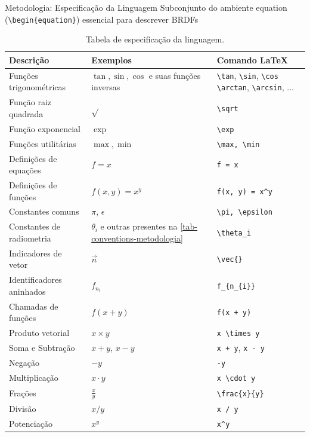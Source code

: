 \begin{frame}[fragile]{Metodologia: Especificação da Linguagem}
    Subconjunto do ambiente equation (\verb|\begin{equation}|) essencial para descrever BRDFs
\begin{table}
\centering
    \scriptsize %
\begin{tabular}{l|l|l}
\hline
    \textbf{Descrição} & \textbf{Exemplos} & \textbf{Comando \LaTeX{}} \\ \hline

    Funções trigonométricas & $\tan, \sin, \cos$ {\tiny e suas funções inversas}
    &\small\verb"\tan", \verb"\sin", \verb"\cos"
    \newline\verb"\arctan", \verb"\arcsin", $\dots$
    \\ \hline
    Função raiz quadrada & $\sqrt{}$ & \verb|\sqrt| \\ \hline
    Função exponencial & $\exp{}$ & \verb|\exp| \\ \hline
    Funções utilitárias & $\max, \min$ & \verb|\max, \min| \\ \hline
    Definições de equações & $f = x$ & \verb|f = x| \\ \hline
    Definições de funções & $f(x, y) = x^y$ & \verb|f(x, y) = x^y| \\ \hline
    Constantes comuns & $\pi$, $\epsilon$ & \verb|\pi, \epsilon| \\ \hline
    Constantes de radiometria & $\theta_i$ {\tiny e outras presentes na \autoref{tab-conventions-metodologia}} & \verb|\theta_i| \\ \hline
    Indicadores de vetor & $\vec{n}$ & \verb|\vec{}| \\ \hline
    Identificadores aninhados & $f_{n_{i}}$ & \verb|f_{n_{i}}| \\ \hline
    Chamadas de funções & $f(x + y)$ & \verb|f(x + y)| \\ \hline
    Produto vetorial & $x \times y$ & \verb|x \times y| \\ \hline
    Soma e Subtração & $x + y$, $x - y$ & \verb|x + y|, \verb|x - y| \\ \hline
    Negação & $-y$ & \verb|-y| \\ \hline
    Multiplicação & $x \cdot y$ & \verb|x \cdot y| \\ \hline
    Frações & $\frac{x}{y}$ & \verb|\frac{x}{y}| \\ \hline
    Divisão & $x / y$ & \verb|x / y| \\ \hline
    Potenciação & $x^y$ & \verb|x^y| \\ \hline
\end{tabular}
\caption{Tabela de especificação da linguagem.}
\label{tab-definition-of-lang}
\end{table}
\end{frame}



